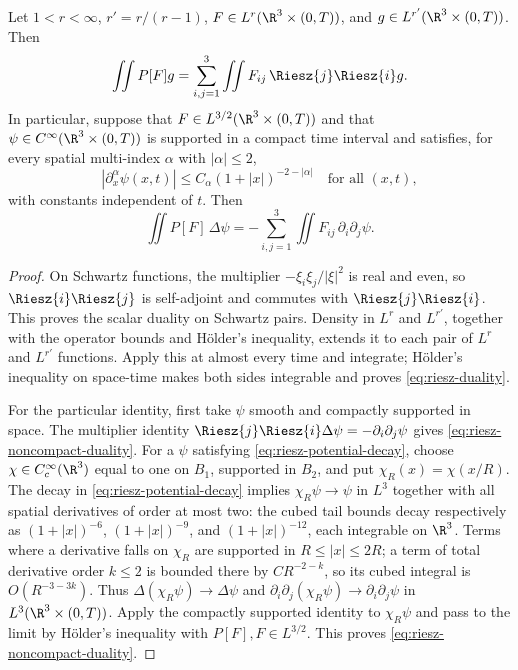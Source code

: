 \documentclass[11pt,reqno]{amsart}
\begin{document}
\begin{lemma}\label{lem:riesz-duality}
Let $1<r<\infty$, $r'=r/(r-1)$, $F\in L^r(\R^3\times(0,T))$, and
$g\in L^{r'}(\R^3\times(0,T))$. Then
\begin{equation}\label{eq:riesz-duality}
\iint P[F]g=\sum_{i,j=1}^3\iint F_{ij}\,\Riesz{j}\Riesz{i}g.
\end{equation}
In particular, suppose that $F\in L^{3/2}(\R^3\times(0,T))$ and that
$\psi\in C^\infty(\R^3\times(0,T))$ is supported in a compact time interval
and satisfies, for every spatial multi-index $\alpha$ with $|\alpha|\le2$,
\begin{equation}\label{eq:riesz-potential-decay}
|\partial_x^\alpha\psi(x,t)|\le C_\alpha(1+|x|)^{-2-|\alpha|}
\quad\text{for all }(x,t),
\end{equation}
with constants independent of $t$. Then
\begin{equation}\label{eq:riesz-noncompact-duality}
\iint P[F]\,\Delta\psi
=-\sum_{i,j=1}^3\iint F_{ij}\,\partial_i\partial_j\psi.
\end{equation}
\end{lemma}

\begin{proof}
On Schwartz functions, the multiplier $-\xi_i\xi_j/|\xi|^2$ is real and
even, so $\Riesz{i}\Riesz{j}$ is self-adjoint and commutes with
$\Riesz{j}\Riesz{i}$. This proves the scalar duality on Schwartz pairs.
Density in $L^r$ and $L^{r'}$, together with the operator bounds and
Hölder's inequality, extends it to each pair of $L^r$ and $L^{r'}$
functions. Apply this at almost every time and integrate; Hölder's
inequality on space-time makes both sides integrable and proves
\eqref{eq:riesz-duality}.

For the particular identity, first take $\psi$ smooth and compactly
supported in space. The multiplier identity
$\Riesz{j}\Riesz{i}\Delta\psi=-\partial_i\partial_j\psi$ gives
\eqref{eq:riesz-noncompact-duality}. For a $\psi$ satisfying
\eqref{eq:riesz-potential-decay}, choose $\chi\in C_c^\infty(\R^3)$ equal to
one on $B_1$, supported in $B_2$, and put $\chi_R(x)=\chi(x/R)$. The decay
in \eqref{eq:riesz-potential-decay} implies
$\chi_R\psi\to\psi$ in $L^3$ together with all spatial derivatives of order
at most two: the cubed tail bounds decay respectively as
$(1+|x|)^{-6}$, $(1+|x|)^{-9}$, and $(1+|x|)^{-12}$, each integrable on
$\R^3$. Terms where a derivative falls on $\chi_R$ are supported in
$R\le|x|\le2R$; a term of total derivative order $k\le2$ is bounded there
by $C R^{-2-k}$, so its cubed integral is $O(R^{-3-3k})$. Thus
$\Delta(\chi_R\psi)\to\Delta\psi$ and
$\partial_i\partial_j(\chi_R\psi)\to\partial_i\partial_j\psi$ in
$L^3(\R^3\times(0,T))$. Apply the compactly supported identity to
$\chi_R\psi$ and pass to the limit by Hölder's inequality with
$P[F],F\in L^{3/2}$. This proves
\eqref{eq:riesz-noncompact-duality}.
\end{proof}
\end{document}
